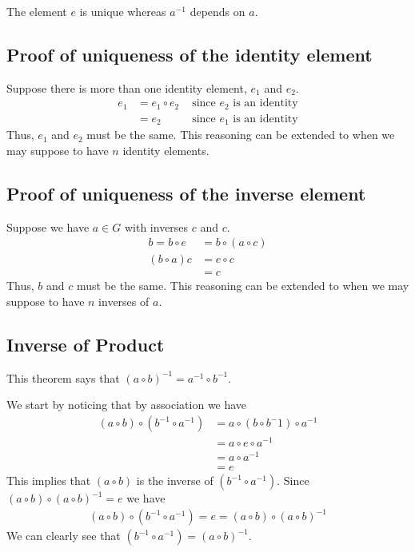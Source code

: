 \documentclass{article}
\begin{document}
The element \(e\) is unique whereas \(a^{-1}\) depends on \(a\).

\subsection{Proof of uniqueness of the identity element}

Suppose there is more than one identity element, \(e_1\) and \(e_2\).
\begin{align*}
    e_1 &= e_1 \circ e_2 &\text { since \(e_2\) is an identity} \\
    &= e_2 &\text { since \(e_1\) is an identity}
\end{align*}
Thus, \(e_1\) and \(e_2\) must be the same. This reasoning can be extended
to when we may suppose to have \(n\) identity elements.

\subsection{Proof of uniqueness of the inverse element}

Suppose we have \(a\in G\) with inverses \(c\) and \(c\).
\begin{align*}
    b = b \circ e &= b \circ (a \circ c)\\
    (b \circ a) c &= e \circ c \\
    &= c
\end{align*}
Thus, \(b\) and \(c\) must be the same. This reasoning can be extended
to when we may suppose to have \(n\) inverses of \(a\).


\subsection{Inverse of Product}

This theorem says that \({(a \circ b)}^{-1} = a^{-1} \circ b^{-1}\).

We start by noticing that by association we have
\begin{align*}
    (a \circ b) \circ (b^{-1} \circ a^{-1}) &= a \circ (b \circ b^-1) \circ a^{-1} \\
    &= a \circ e \circ a^{-1} \\
    &= a \circ a^{-1} \\
    &= e
\end{align*}
This implies that \((a \circ b)\) is the inverse of \((b^{-1} \circ a^{-1})\).
Since \((a\circ b) \circ {(a \circ b)}^{-1} =e\) we have
\begin{align*}
    (a \circ b) \circ (b^{-1} \circ a^{-1}) = e = (a\circ b) \circ {(a \circ b)}^{-1}
\end{align*}
We can clearly see that \((b^{-1} \circ a^{-1}) = {(a \circ b)}^{-1}\).
\end{document}
